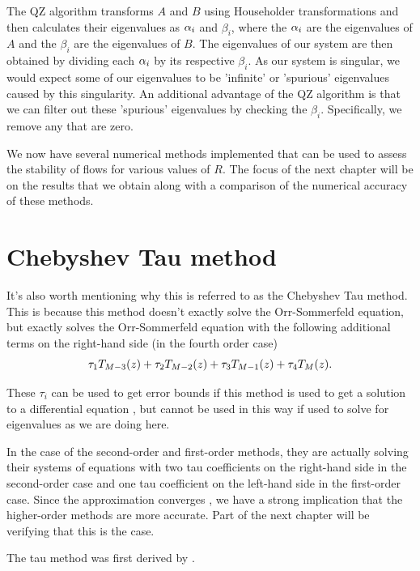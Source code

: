 The QZ algorithm transforms $A $ and $B$ using Householder transformations and then calculates their eigenvalues as $ \alpha_i$ and $ \beta_i$, where the $ \alpha_i$ are the eigenvalues of $A $ and the $ \beta_i$ are the eigenvalues of $ B$. The eigenvalues of our system are then obtained by dividing each $ \alpha_i$ by its respective $ \beta_i$. As our system is singular, we would expect some of our eigenvalues to be 'infinite' or 'spurious' eigenvalues caused by this singularity. An additional advantage of the QZ algorithm is that we can filter out these 'spurious' eigenvalues by checking the $ \beta_i$. Specifically, we remove any that are zero.

We now have several numerical methods implemented that can be used to assess the stability of flows for various values of $ R $. The focus of the next chapter will be on the results that we obtain along with a comparison of the numerical accuracy of these methods.

\section{Chebyshev Tau method}

It's also worth mentioning why this is referred to as the Chebyshev Tau method. This is because this method doesn't exactly solve the Orr-Sommerfeld equation, but exactly solves the Orr-Sommerfeld equation with the following additional terms on the right-hand side (in the fourth order case)
\begin{equation}
    \tau_1 T_{M-3}(z) + \tau_2 T_{M-2}(z) + \tau_3 T_{M-1}(z) + \tau_4 T_{M}(z).
\end{equation}

These $ \tau_i$ can be used to get error bounds if this method is used to get a solution to a differential equation \citep{fox1968chebyshev}, but cannot be used in this way if used to solve for eigenvalues as we are doing here. 

In the case of the second-order and first-order methods, they are actually solving their systems of equations with two tau coefficients on the right-hand side in the second-order case and one tau coefficient on the left-hand side in the first-order case. Since the approximation converges \citet{orszag1971accurate}, we have a strong implication that the higher-order methods are more accurate. Part of the next chapter will be verifying that this is the case.

The tau method was first derived by \citet{lanczos1988applied}.
